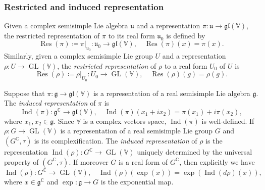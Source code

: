 \documentclass[11pt,reqno]{amsart}
\DeclareMathOperator{\GL}{GL}
\DeclareMathOperator{\Ind}{Ind}
\DeclareMathOperator{\Res}{Res}
\newcommand{\CC}{\mathbb{C}} %
\begin{document}
\subsubsection{Restricted and induced representation}
Given a complex semisimple Lie algebra $\mathfrak{u}$ and a representation $\pi: \mathfrak{u} \to \mathfrak{gl}(\mathbb{V})$,  the restricted representation of $\pi$ to its real form $\mathfrak{u}_0$ is defined by 
\[
\Res(\pi) \coloneqq \pi|_{\mathfrak{u}_0}: \mathfrak{u}_0 \to \mathfrak{gl}(\mathbb{V}),\quad 
\Res(\pi)(x) = \pi(x).
\]
Similarly,  given a complex semisimple Lie group $U$ and a representation $\rho: U \to \GL(\mathbb{V})$,  the \emph{restricted representation} of $\rho$ to a real form $U_0$ of $U$ is  
\[
\Res(\rho) \coloneqq \rho|_{U_0}: U_0 \to \GL(\mathbb{V}),\quad \Res(\rho)(g) = \rho(g).
\]

Suppose that $\pi: \mathfrak{g} \to \mathfrak{gl}(\mathbb{V})$ is a representation of a real semisimple Lie algebra $\mathfrak{g}$.  The \emph{induced representation} of $\pi$ is 
\[
    \Ind(\pi): \mathfrak{g}^{\mathbb{C}} \to \mathfrak{gl}(\mathbb{V}),\quad \Ind(\pi)(x_1 + i x_2) = \pi(x_1) + i \pi(x_2), 
\]
where $x_1,x_2 \in \mathfrak{g}$.  Since $\mathbb{V}$ is a complex vectors space,  $\Ind(\pi)$ is well-defined.  If $\rho: G \to \GL(\mathbb{V})$ is a representation of a real semisimple Lie group $G$ and $(G^{\mathbb{C}},\tau)$ is its complexification.  The \emph{induced representation} of $\rho$ is the representation $\Ind (\rho):G^\mathbb{C} \to \GL(\mathbb{V})$ uniquely determined by the universal property of $(G^\mathbb{C},\tau)$. If moreover $G$ is a real form of $G^{\CC}$, then explicitly we have
\[
\Ind(\rho): G^\mathbb{C} \to \GL(\mathbb{V}),\quad \Ind(\rho)(\exp (x)) = \exp (\Ind( d \rho) (x)),
\]
where $x\in \mathfrak{g}^{\mathbb{C}}$ and $\exp:\mathfrak{g} \to G$ is the exponential map.
\end{document}
